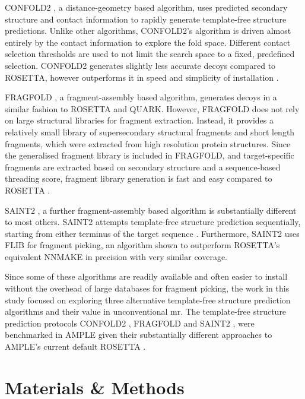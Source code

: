 CONFOLD2 \cite{Adhikari2018-lj}, a distance-geometry based algorithm, uses predicted secondary structure and contact information to rapidly generate template-free structure predictions. Unlike other algorithms, CONFOLD2's algorithm is driven almost entirely by the contact information to explore the fold space. Different contact selection thresholds are used to not limit the search space to a fixed, predefined selection. CONFOLD2 generates slightly less accurate decoys compared to ROSETTA, however outperforms it in speed and simplicity of installation \cite{Adhikari2018-lj,Michel2017-xh}.

FRAGFOLD \cite{Jones2001-mc}, a fragment-assembly based algorithm, generates decoys in a similar fashion to ROSETTA and QUARK. However, FRAGFOLD does not rely on large structural libraries for fragment extraction. Instead, it provides a relatively small library of supersecondary structural fragments and short length fragments, which were extracted from high resolution protein structures. Since the generalised fragment library is included in FRAGFOLD, and target-specific fragments are extracted based on secondary structure and a sequence-based threading score, fragment library generation is fast and easy compared to ROSETTA \cite{Kosciolek2014-bt}.

SAINT2 \cite{De_Oliveira2018-sg}, a further fragment-assembly based algorithm is substantially different to most others. SAINT2 attempts template-free structure prediction sequentially, starting from either terminus of the target sequence \cite{De_Oliveira2018-sg}. Furthermore, SAINT2 uses FLIB \cite{De_Oliveira2015-kb} for fragment picking, an algorithm shown to outperform ROSETTA's equivalent NNMAKE \cite{Gront2011-sv} in precision with very similar coverage.

Since some of these algorithms are readily available and often easier to install without the overhead of large databases for fragment picking, the work in this study focused on exploring three alternative template-free structure prediction algorithms and their value in unconventional \gls{mr}. The template-free structure prediction protocols CONFOLD2 \cite{Adhikari2018-lj}, FRAGFOLD \cite{Jones2001-mc} and SAINT2 \cite{De_Oliveira2018-sg}, were benchmarked in AMPLE given their substantially different approaches to AMPLE's current default ROSETTA \cite{Rohl2004-dj}.

\section{Materials \& Methods}
